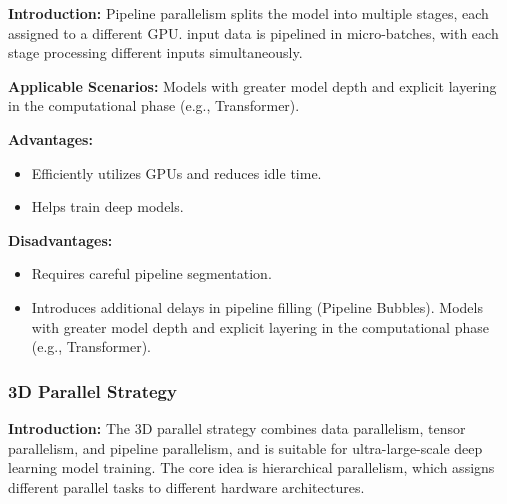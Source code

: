 \documentclass{article}
\begin{document}
\textbf{Introduction:} Pipeline parallelism splits the model into multiple stages, each assigned to a different GPU. input data is pipelined in micro-batches, with each stage processing different inputs simultaneously.

\textbf{Applicable Scenarios:} Models with greater model depth and explicit layering in the computational phase (e.g., Transformer).

\textbf{Advantages:} 
    \begin{itemize}
            \item Efficiently utilizes GPUs and reduces idle time.
        \end{itemize}
    
    \begin{itemize}
        
            \item Helps train deep models.
        \end{itemize}

\textbf{Disadvantages:} 
\begin{itemize}
       
            \item Requires careful pipeline segmentation.
        \end{itemize}
    
    \begin{itemize}
        
            \item Introduces additional delays in pipeline filling (Pipeline Bubbles). Models with greater model depth and explicit layering in the computational phase (e.g., Transformer).
        \end{itemize}

 \subsubsection{3D Parallel Strategy}
\hspace{2em}

\textbf{Introduction:} The 3D parallel strategy combines data parallelism, tensor parallelism, and pipeline parallelism, and is suitable for ultra-large-scale deep learning model training. The core idea is hierarchical parallelism, which assigns different parallel tasks to different hardware architectures.
\end{document}
